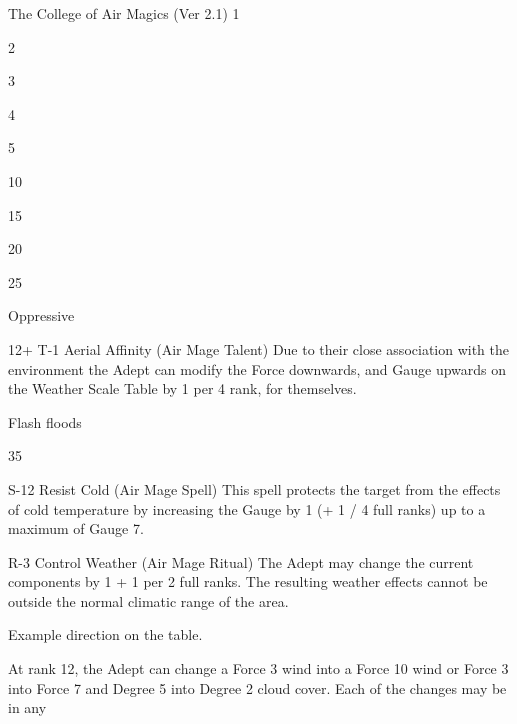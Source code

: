 \begin{Chapter}{The College of Air Magics (Ver 2.1)}
1 

2 

3 

4 

5 

10 

15 

20 

25 

Oppressive 

12+ 
T-1 Aerial Affinity (Air Mage Talent) Due to their close association with the environment the Adept can modify the Force downwards, and Gauge upwards on 
the Weather Scale Table by 1 per 4 rank, for themselves. 

Flash floods 

35 

S-12 Resist Cold (Air Mage Spell) This spell protects the target from the effects of cold temperature by increasing the Gauge by 1 (+ 1 / 4 full ranks) up to a 
maximum of Gauge 7. 

R-3 Control Weather (Air Mage Ritual) The Adept may change the current components by 1 + 1 per 2 full ranks. The resulting weather effects cannot be outside 
the normal climatic range of the area. 

Example 
direction on the table. 

At rank 12, the Adept can change a Force 3 wind into a Force 10 wind or Force 3 into Force 7 and Degree 5 into Degree 2 cloud cover. Each of the changes may be in any 

\end{Chapter}
